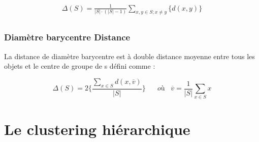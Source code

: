 \begin{equation}
	\begin{split}
		\Delta (S) = \frac{1}{\left\lvert S \right\rvert \cdot  (\left\lvert S \right\rvert - 1)} \sum_{x,y \in S ; x \neq y} \{ d(x,y) \} \\
	\end{split}
\end{equation}

\subsubsection{Diamètre barycentre Distance}
La distance de diamètre barycentre est à double distance moyenne entre tous les objets et le centre de groupe de s défini comme :

\begin{equation}
	\Delta (S) = 2  \Bigg \{
	\frac{\sum_{x \in S}d(x,\overline{v})}{\left\lvert S \right\rvert } \Bigg\} 
	\hspace{20pt} où \hspace{10pt} \overline{v} = \frac{1}{\left\lvert S \right\rvert} \sum_{x \in S}x
\end{equation}

\section{Le clustering hiérarchique}
